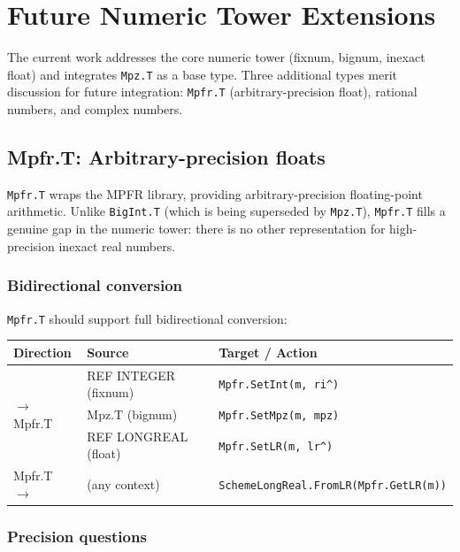 \documentclass[11pt]{article}
\begin{document}
\section{Future Numeric Tower Extensions}
\label{sec:future}

The current work addresses the core numeric tower (fixnum, bignum,
inexact float) and integrates \texttt{Mpz.T} as a base type.  Three
additional types merit discussion for future integration:
\texttt{Mpfr.T} (arbitrary-precision float), rational numbers, and
complex numbers.

\subsection{Mpfr.T: Arbitrary-precision floats}

\texttt{Mpfr.T} wraps the MPFR library, providing arbitrary-precision
floating-point arithmetic.  Unlike \texttt{BigInt.T} (which is being
superseded by \texttt{Mpz.T}), \texttt{Mpfr.T} fills a genuine gap
in the numeric tower: there is no other representation for
high-precision inexact real numbers.

\subsubsection{Bidirectional conversion}

\texttt{Mpfr.T} should support full bidirectional conversion:

\begin{center}
\begin{tabular}{lll}
\toprule
\textbf{Direction} & \textbf{Source} & \textbf{Target / Action} \\
\midrule
\multirow{3}{*}{$\to$ Mpfr.T} & REF INTEGER (fixnum) & \texttt{Mpfr.SetInt(m, ri\^{})} \\
 & Mpz.T (bignum) & \texttt{Mpfr.SetMpz(m, mpz)} \\
 & REF LONGREAL (float) & \texttt{Mpfr.SetLR(m, lr\^{})} \\
\midrule
\multirow{1}{*}{Mpfr.T $\to$} & (any context) & \texttt{SchemeLongReal.FromLR(Mpfr.GetLR(m))} \\
\bottomrule
\end{tabular}
\end{center}

\subsubsection{Precision questions}
\end{document}

